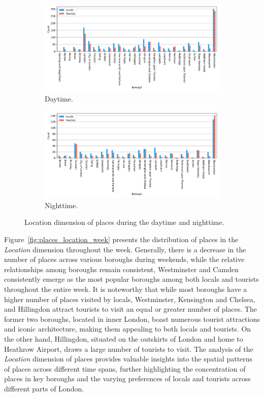 \documentclass{article}
\theoremstyle{definition}
\theoremstyle{remark}
\begin{document}
\begin{figure}[!h]

\centering
\begin{subfigure}{0.6\textheight}
\centering
\includegraphics[width=0.9\linewidth]{figures/places_location_daytime.png} 
\caption{Daytime.}
\label{fig:places_location_daytime}
\end{subfigure}
\begin{subfigure}{0.6\textheight}
\centering
\includegraphics[width=0.9\linewidth]{figures/places_location_nighttime.png}
\caption{Nighttime.}
\label{fig:places_location_nighttime}
\end{subfigure}

\caption{Location dimension of places during the daytime and nighttime.}
\label{fig:places_location_day}
\end{figure}

Figure~\ref{fig:places_location_week} presents the distribution of places in the \textit{Location} dimension throughout the week. Generally, there is a decrease in the number of places across various boroughs during weekends, while the relative relationships among boroughs remain consistent, Westminster and Camden consistently emerge as the most popular boroughs among both locals and tourists throughout the entire week. It is noteworthy that while most boroughs have a higher number of places visited by locals, Westminster, Kensington and Chelsea, and Hillingdon attract tourists to visit an equal or greater number of places. The former two boroughs, located in inner London, boast numerous tourist attractions and iconic architecture, making them appealing to both locals and tourists. On the other hand, Hillingdon, situated on the outskirts of London and home to Heathrow Airport, draws a large number of tourists to visit. The analysis of the \textit{Location} dimension of places provides valuable insights into the spatial patterns of places across different time spans, further highlighting the concentration of places in key boroughs and the varying preferences of locals and tourists across different parts of London.
\end{document}
